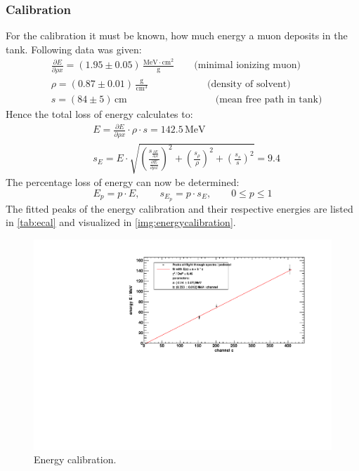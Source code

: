 \subsubsection{Calibration}
For the calibration it must be known, how much energy a muon deposits in the tank. Following data was given:
\begin{equation}
    \begin{split}
        & \frac{\partial E}{\partial \rho x} = (1.95 \pm 0.05)\,\frac{\text{MeV}\cdot\text{cm}^2}{\text{g}} \qquad \text{(minimal ionizing muon)}  \\
        & \rho = (0.87 \pm 0.01) \, \frac{\text{g}}{\text{cm}^3}  \qquad \qquad \qquad \text{(density of solvent)} \\
        & s = (84 \pm 5) \, \text{cm} \qquad \qquad \qquad \qquad \quad  \text{(mean free path in tank)}
    \end{split}
\end{equation}
Hence the total loss of energy calculates to:
\begin{equation}
    \begin{split}
        & E = \frac{\partial E}{\partial \rho x} \cdot \rho \cdot s = 142.5\,\text{MeV} \\
        & s_{E} = E \cdot \sqrt{ \left( \frac{s_{\frac{\partial E}{\partial \rho x}}}{\frac{\partial E}{\partial \rho x}} \right)^2 + \left( \frac{s_\rho}{\rho} \right)^2 + \left( \frac{s_s}{s} \right)^2  }
        = 9.4
    \end{split}
\end{equation}
The percentage loss of energy can now be determined:
\begin{equation}
    E_p = p \cdot E, \qquad s_{E_p} = p \cdot s_E, \qquad 0 \leq p \leq 1  %
\end{equation}
The fitted peaks of the energy calibration and their respective energies are listed in \autoref{tab:ecal} and visualized in \autoref{img:energycalibration}.

\begin{figure}[H]
\begin{center}
  \includegraphics[width=\textwidth]{../img/energyCalibration.pdf}
  \caption{Energy calibration.}
  \label{img:energycalibration}
\end{center}
\end{figure}
